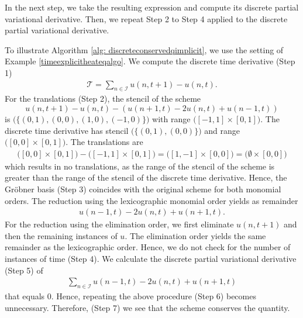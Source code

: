 \documentclass[runningheads]{llncs}
\newcommand{\1}{\chi}
\newcommand{\Ii}{\mathcal{I}}
\begin{document}
In the next step, we take the resulting expression and compute its discrete partial variational derivative. Then, we repeat Step 2 to Step 4 applied to the discrete partial variational derivative.
\begin{example}
	\label{heateqalgoimplicit}
	To illustrate Algorithm \ref{alg: discreteconservedqimplicit}, we use the setting of Example \ref{timeexplicitheateqalgo}.
	We compute the discrete time derivative (Step 1)
	\begin{gather*}
		\mathcal{T}=\sum_{n\in\Ii} u(n,t+1)-u(n,t).
	\end{gather*}
	For the translations (Step 2), the stencil of the scheme
	\begin{equation*}
		u(n,t+1)-u(n,t)-(u(n+1,t)-2u(n,t)+u(n-1,t))
	\end{equation*}
	\small
	is
	$
	\Big(\big\{(0,1),(0,0),(1,0),(-1,0)\big\}\Big)
	$
	\normalsize
	with range \small$\Big([-1,1]\times[0,1]\Big)$\normalsize.
	The discrete time derivative has stencil \small$\Big(\big\{(0,1),(0,0)\big\}\Big)$\normalsize 
	and range \small$\Big([0,0]\times[0,1]\Big)$\normalsize.
	The translations are
	\small
	\begin{gather*}
		\Big([0,0]\times[0,1]\Big)-\Big([-1,1]\times[0,1]\Big)=\Big([1,-1]\times[0,0]\Big)=\Big(\emptyset\times[0,0]\Big)
	\end{gather*}
	\normalsize
	which results in no translations, as the range of the stencil of the scheme is greater than the range of the stencil of the discrete time derivative.
	Hence, the Gr{\"o}bner basis (Step 3) coincides with the original scheme for both monomial orders.
	The reduction using the lexicographic monomial order yields as remainder
	\begin{gather*}
		u(n-1,t)-2u(n,t)+u(n+1,t).
	\end{gather*}
	For the reduction using the elimination order, we first eliminate $u(n,t+1)$ and then the remaining instances of $u$.
	The elimination order yields the same remainder as the lexicographic order. Hence, we do not check for the number of instances of time (Step 4).
	We calculate the discrete partial variational derivative (Step 5) of
	\begin{gather*}
		\sum_{n\in\Ii}u(n-1,t)-2u(n,t)+u(n+1,t)
	\end{gather*}
	that equals $0$.
	Hence, repeating the above procedure (Step 6) becomes unnecessary.
	Therefore, (Step 7) we see that the scheme conserves the quantity.
\end{example}
\end{document}
